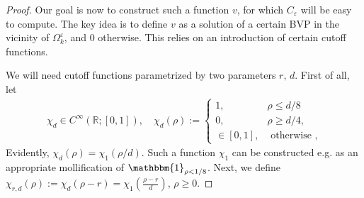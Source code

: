 \documentclass[]{article}
\numberwithin{equation}{section}
\numberwithin{theorem}{section}
\numberwithin{lemma}{section}
\numberwithin{corollary}{section}
\numberwithin{proposition}{section}
\numberwithin{definition}{section}
\newcommand{\re}{\varepsilon}
\begin{document}
\begin{appendices}
\begin{proof}
			Our goal is now to construct such a function $v$, for which $C_{\re}$ will be easy to compute. The key idea is to define $v$ as a solution of a certain BVP in the vicinity of $\Omega_k^{\re}$, and $0$ otherwise. This relies on an introduction of certain cutoff functions. 
			
			We will need cutoff functions parametrized by two parameters $r, \, d$. First of all, let  
			\begin{align*}%
				\chi_{d}\in C^{\infty}(\mathbb{R}; [0,1]), \quad	\chi_{d}(\rho):=\left\{
				\begin{array}{ll}
					1, & \rho\leq d/8\\
					0, & \rho\geq d/4,\\
					\in [0,1], &\text{ otherwise },
				\end{array}	
				\right.
			\end{align*}
			Evidently, $\chi_d(\rho)=\chi_1(\rho/d)$. Such a function $\chi_1$ can be constructed e.g. as an appropriate mollification of $\mathbbm{1}_{\rho<1/8}$. 
			Next, we define $\chi_{r,d}(\rho):=\chi_d(\rho-r)=\chi_1(\frac{\rho-r}{d})$, $\rho\geq 0$. 
			

\end{proof}
\end{appendices}
\end{document}
